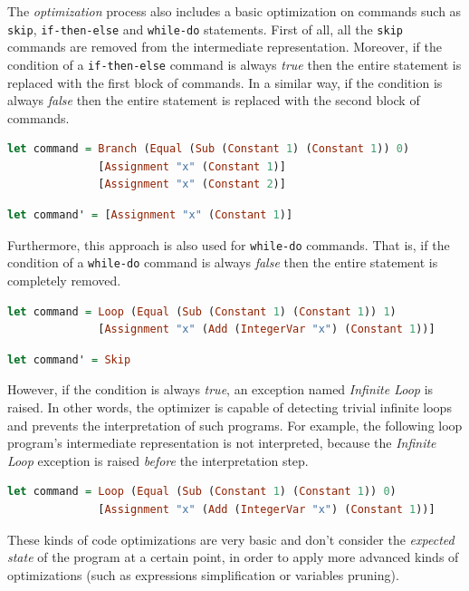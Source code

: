 \documentclass[12pt,a4paper]{article}
\begin{document}
The \textit{optimization} process also includes a basic optimization on commands such as \texttt{skip}, \texttt{if-then-else} and \texttt{while-do} statements.
First of all, all the \texttt{skip} commands are removed from the intermediate representation.
Moreover, if the condition of a \texttt{if-then-else} command is always \textit{true} then the entire statement is replaced with the first block of commands.
In a similar way, if the condition is always \textit{false} then the entire statement is replaced with the second block of commands.
\begin{lstlisting}[language=Haskell, style=custom-style]
let command = Branch (Equal (Sub (Constant 1) (Constant 1)) 0)
              [Assignment "x" (Constant 1)]
              [Assignment "x" (Constant 2)]
\end{lstlisting}
\begin{lstlisting}[language=Haskell, style=custom-style]
let command' = [Assignment "x" (Constant 1)]
\end{lstlisting}
Furthermore, this approach is also used for \texttt{while-do} commands.
That is, if the condition of a \texttt{while-do} command is always \textit{false} then the entire statement is completely removed.
\begin{lstlisting}[language=Haskell, style=custom-style]
let command = Loop (Equal (Sub (Constant 1) (Constant 1)) 1)
              [Assignment "x" (Add (IntegerVar "x") (Constant 1))]
\end{lstlisting}
\begin{lstlisting}[language=Haskell, style=custom-style]
let command' = Skip
\end{lstlisting}
However, if the condition is always \textit{true}, an exception named \textit{Infinite Loop} is raised.
In other words, the optimizer is capable of detecting trivial infinite loops and prevents the interpretation of such programs.
For example, the following loop program's intermediate representation is not interpreted, because the \textit{Infinite Loop} exception is raised \textit{before} the interpretation step.
\begin{lstlisting}[language=Haskell, style=custom-style]
let command = Loop (Equal (Sub (Constant 1) (Constant 1)) 0)
              [Assignment "x" (Add (IntegerVar "x") (Constant 1))]
\end{lstlisting}

These kinds of code optimizations are very basic and don't consider the \textit{expected state} of the program at a certain point, in order to apply more advanced kinds of optimizations (such as expressions simplification or variables pruning).
\end{document}
